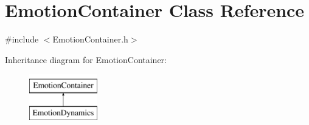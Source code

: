 \hypertarget{class_emotion_container}{
\section{\-Emotion\-Container \-Class \-Reference}
\label{class_emotion_container}
}


{\ttfamily \#include $<$\-Emotion\-Container.\-h$>$}

\-Inheritance diagram for \-Emotion\-Container\-:\begin{figure}[H]
\begin{center}
\leavevmode
\includegraphics[height=2.000000cm]{class_emotion_container}
\end{center}
\end{figure}
